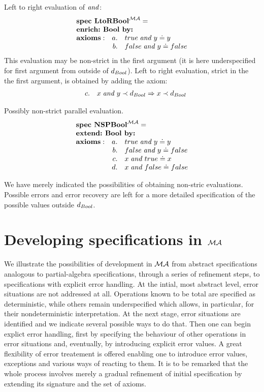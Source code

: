 \documentclass[10pt]{article}
\begin{document}
\begin{example}
Left to right evaluation of $\mathrel{\mathit{and}}$:
\[ \spec{
	\tit{\mbox {\bf spec\ LtoRBool}^{\inst{MA}}=} \\	
	\tit{\mbox{\bf enrich:\  Bool\ by:}}\\
	{\bf axioms:}
		&a.& true \band y \eleq y\\	
		&b.& false \band y \eleq false \\
}\]
This evaluation may be non-strict in the first argument (it is here
	underspecified for first argument from outside of $d_{Bool}$).
Left to right evaluation, strict in the the first argument, is obtained by
	adding the axiom:
\[\spec{
		&c.& x\band y \prec \ok{Bool} \To x \prec \ok{Bool}
}
\]
\end{example}

		
\begin{example}
Possibly non-strict parallel evaluation.
\[ \spec{
	\tit{\mbox {\bf spec\ NSPBool}^{\inst{MA}}=} \\	
	\tit{\mbox{\bf extend:\  Bool\ by:}}\\
	{\bf axioms:}
		&a.& true\band y \eleq y \\
		&b.& false\band y \eleq false \\
		&c.& x \band true \eleq x \\
		&d.& x\band false \eleq false \\
}\]
\end{example}
%
We have merely indicated the possibilities of obtaining non-stric evaluations. Possible
errors and error recovery are left for a more detailed specification of the
possible values outside $d_{Bool}$.


\section{Developing specifications in ${\mathcal{MA}}$}
\label{se:meth}
We illustrate the possibilities of development in ${\mathcal{MA}}$
from abstract specifications analogous to partial-algebra specifications,
through a series of refinement steps, to specifications with explicit error
handling. At the intial, most abstract level, error situations are not
addressed at all. Operations known to be total are specified as
deterministic, while others remain underspecified which allows, in
particular, for their nondeterministic interpretation. At the next stage,
error situations are identified and we indicate several possible ways to do
that. Then one can begin explict error handling, first by specifying the
behaviour of other operations in error situations and, eventually, by
introducing explicit error values. A great flexibility of error treatement is
offered enabling one to introduce error values, exceptions and various ways
of reacting to them.
It is to be remarked that the whole
process involves merely a gradual refinement of initial specification by
extending its signature and the set of axioms.
\end{document}
